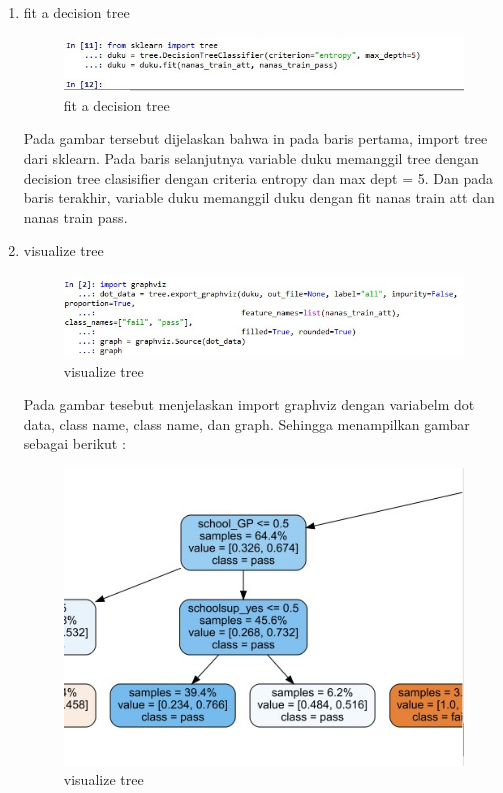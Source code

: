 \begin{enumerate}
\item fit a decision tree
\begin{figure}
\centering
\includegraphics[scale=0.5]{figures/g5.jpg}
\caption{fit a decision tree}
\label{contoh}
\end{figure}
\par Pada gambar tersebut dijelaskan bahwa in pada baris pertama, import tree dari sklearn. Pada baris selanjutnya variable duku memanggil tree dengan decision tree clasisifier dengan criteria entropy dan max dept = 5. Dan pada baris terakhir, variable duku memanggil duku dengan fit nanas train att dan nanas train pass.

\item visualize tree 
\begin{figure}
\centering
\includegraphics[scale=0.5]{figures/g6a.jpg}
\caption{visualize tree}
\label{contoh}
\end{figure}
\par Pada gambar tesebut menjelaskan import graphviz dengan variabelm dot data, class name, class name, dan graph. Sehingga menampilkan gambar sebagai berikut :
\begin{figure}
\centering
\includegraphics[scale=0.5]{figures/g6b.jpeg}
\caption{visualize tree}
\label{contoh}
\end{figure}



\end{enumerate}
